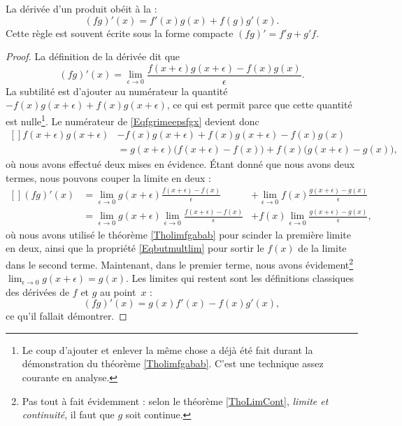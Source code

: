 \documentclass{article}
\begin{document}
\begin{proposition}
	La dérivée d'un produit obéit à la :
	\begin{equation}
		(fg)'(x)=f'(x)g(x)+f(g)g'(x).
	\end{equation}
	Cette règle est souvent écrite sous la forme compacte $(fg)'=f'g+g'f$.
\end{proposition}

\begin{proof}
La définition de la dérivée dit que
\begin{equation}		\label{Eqfgrimeepsfgx}
	(fg)'(x)=\lim_{\epsilon\to 0}\frac{f(x+\epsilon)g(x+\epsilon)-f(x)g(x)}{\epsilon}.
\end{equation}
La subtilité est d'ajouter au numérateur la quantité $-f(x)g(x+\epsilon)+f(x)g(x+\epsilon)$, ce qui est permit parce que cette quantité est nulle\footnote{Le coup d'ajouter et enlever la même chose a déjà été fait durant la démonstration du théorème \ref{Tholimfgabab}. C'est une technique assez courante en analyse.}. Le numérateur de \eqref{Eqfgrimeepsfgx} devient donc
\begin{equation}
	\begin{aligned}[]
f(x+\epsilon)g(x+\epsilon)&-f(x)g(x+\epsilon)+f(x)g(x+\epsilon)-f(x)g(x) \\
			&= g(x+\epsilon)\big( f(x+\epsilon)-f(x) \big)+f(x)\big( g(x+\epsilon)-g(x) \big),
	\end{aligned}
\end{equation}
où nous avons effectué deux mises en évidence. Étant donné que nous avons deux termes, nous pouvons couper la limite en deux :
\begin{equation}
	\begin{aligned}[]
		(fg)'(x)	&=\lim_{\epsilon\to 0}g(x+\epsilon)\frac{ f(x+\epsilon)-f(x) }{\epsilon} 			&+\lim_{\epsilon\to 0}f(x)\frac{ g(x+\epsilon)-g(x) }{\epsilon}\\
				&=\lim_{\epsilon\to 0}g(x+\epsilon)\lim_{\epsilon\to 0}\frac{ f(x+\epsilon)-f(x) }{\epsilon}	&+f(x)\lim_{\epsilon\to 0}\frac{ g(x+\epsilon)-g(x) }{\epsilon},
	\end{aligned}
\end{equation}
où nous avons utilisé le théorème \ref{Tholimfgabab} pour scinder la première limite en deux, ainsi que la propriété \eqref{Eqbutmultlim} pour sortir le $f(x)$ de la limite dans le second terme. Maintenant, dans le premier terme, nous avons évidement\footnote{Pas tout à fait évidemment : selon le théorème \ref{ThoLimCont}, \emph{limite et continuité}, il faut que $g$ soit continue.} $\lim_{\epsilon\to 0}g(x+\epsilon)=g(x)$. Les limites qui restent sont les définitions classiques des dérivées de $f$ et $g$ au point~$x$ :
\begin{equation}
	(fg)'(x)=g(x)f'(x)-f(x)g'(x),
\end{equation}
ce qu'il fallait démontrer.
\end{proof}
\end{document}
